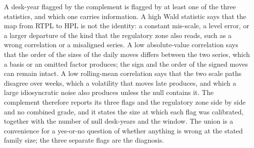 A desk-year flagged by the complement is flagged by at least one of the three statistics, and which one carries information.
A high Wald statistic says that the map from RTPL to HPL is not the identity: a constant mis-scale, a level error, or a larger departure of the kind that the regulatory zone also reads, such as a wrong correlation or a misaligned series.
A low absolute-value correlation says that the order of the sizes of the daily moves differs between the two series, which a basis or an omitted factor produces; the sign and the order of the signed moves can remain intact.
A low rolling-mean correlation says that the two scale paths disagree over weeks, which a volatility that moves late produces, and which a large idiosyncratic noise also produces unless the null contains it.
The complement therefore reports its three flags and the regulatory zone side by side and no combined grade, and it states the size at which each flag was calibrated, together with the number of null desk-years and the window.
The union is a convenience for a yes-or-no question of whether anything is wrong at the stated family size; the three separate flags are the diagnosis.
